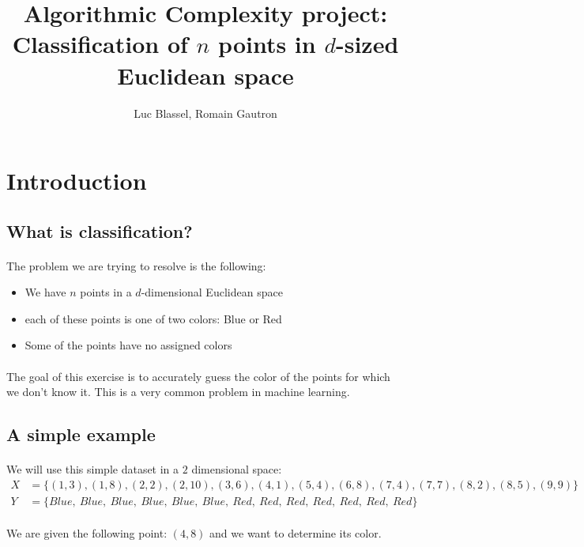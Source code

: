 \documentclass[11 pt]{article}
\title{Algorithmic Complexity project:\\ Classification of $n$ points in $d$-sized Euclidean space}
\author{Luc Blassel, Romain Gautron}
\begin{document}
\maketitle

\section{Introduction}
\subsection{What is classification?}
\paragraph{}The problem we are trying to resolve is the following:
\begin{itemize}
  \item We have $n$ points in a $d$-dimensional Euclidean space
  \item each of these points is one of two colors: Blue or Red
  \item Some of the points have no assigned colors
\end{itemize}
\paragraph{}The goal of this exercise is to accurately guess the color of the points for which we don't know it. This is a very common problem in machine learning.

\subsection{A simple example}
\paragraph{}We will use this simple dataset in a $2$ dimensional space:
\begin{align*}
  X &=\{(1, 3),(1, 8), (2, 2), (2, 10), (3, 6), (4, 1), (5, 4), (6, 8), (7, 4), (7, 7), (8, 2), (8, 5), (9, 9)\}\\
  Y &= \{Blue,\ Blue,\ Blue,\ Blue,\ Blue,\ Blue,\ Red,\ Red,\ Red,\ Red,\ Red,\ Red,\ Red \}
\end{align*}
\paragraph{}We are given the following point: $(4,8)$ and we want to determine its color.
\end{document}
